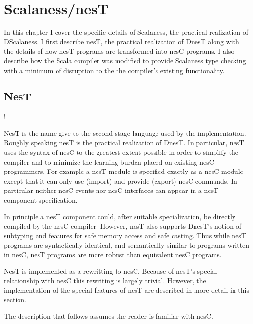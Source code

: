 \chapter{Scalaness/nesT}
\label{chapter-scalaness-nest}

In this chapter I cover the specific details of Scalaness, the practical realization of
DScalaness. I first describe nesT, the practical realization of DnesT along with the details of
how nesT programs are transformed into nesC programs. I also describe how the Scala compiler was
modified to provide Scalaness type checking with a minimum of disruption to the the compiler's
existing functionality.

\section{NesT}
\label{section-nest-implementation}

\lstset{language=nesC}
\lstMakeShortInline!


NesT is the name give to the second stage language used by the implementation. Roughly speaking
nesT is the practical realization of DnesT. In particular, nesT uses the syntax of nesC to the
greatest extent possible in order to simplify the compiler and to minimize the learning burden
placed on existing nesC programmers. For example a nesT module is specified exactly as a nesC
module except that it can only use (import) and provide (export) nesC commands. In particular
neither nesC events nor nesC interfaces can appear in a nesT component specification.

In principle a nesT component could, after suitable specialization, be directly compiled by the
nesC compiler. However, nesT also supports DnesT's notion of subtyping and features for safe
memory access and safe casting. Thus while nesT programs are syntactically identical, and
semantically similar to programs written in nesC, nesT programs are more robust than equivalent
nesC programs.

NesT is implemented as a rewritting to nesC. Because of nesT's special relationship with nesC
this rewriting is largely trivial. However, the implementation of the special features of nesT
are described in more detail in this section.

The description that follows assumes the reader is familiar with nesC.

